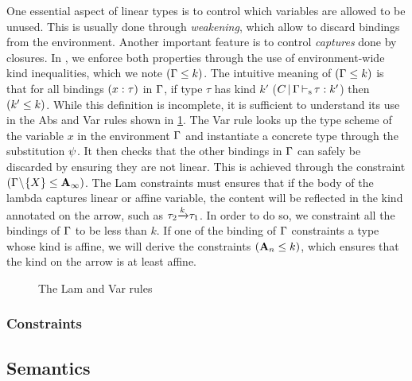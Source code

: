 One essential aspect of linear types is to control which variables
are allowed to be unused. This is usually done through \emph{weakening},
which allow to discard bindings from the environment.
Another important feature is to control \emph{captures} done by closures.
In \lang, we enforce both properties through the use of environment-wide
kind inequalities, which we note $\Cleq{\E}{k}$.
The intuitive meaning of $\Cleq{\E}{k}$ is that for all bindings
$\bvar{x}{\tau}$ in $\E$,
if type $\tau$ has kind $k'$ ($\inferSK{C}{\E}{\tau}{k'}$)
then $\Cleq{k'}{k}$.
While this definition is incomplete, it is sufficient to understand
its use in the {\sc Abs} and {\sc Var} rules shown in \cref{selectrules:binders}.
%
The {\sc Var} rule looks up the type scheme of the variable $x$ in
the environment $\E$
and instantiate a concrete type through the substitution $\unif$. It then
checks that the other bindings in $\E$ can safely be discarded by
ensuring they are not linear. This is achieved through the constraint
$\Cleq{\E\Sdel{X}}{\kaff_\infty}$.
%
The {\sc Lam} constraints must ensures that if the body of the lambda captures
linear or affine variable, the content will be reflected in the kind
annotated on the arrow, such as $\tau_2 \tarr{k} \tau_1$.
In order to do so, we constraint all the bindings of $\E$ to be less than $k$.
If one of the binding of $\E$ constraints a type whose kind is affine,
we will derive the constraints $\Cleq{\kaff_n}{k}$, which ensures that
the kind on the arrow is at least affine.

\begin{figure}[!h]
  \centering
  \begin{mathpar}
    
  \end{mathpar}
  \caption{The {\sc Lam} and {\sc Var} rules}
  \label{selectrules:binders}
\end{figure}



\subsubsection{Constraints}





\clearpage
\subsection{Semantics}
\label{sem}





